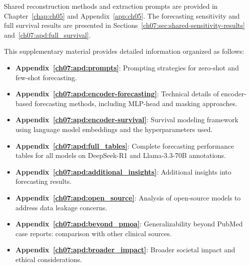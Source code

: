










 

Shared reconstruction methods and extraction prompts are provided in Chapter~\ref{chap:ch05} and Appendix~\ref{app:ch05}.
The forecasting sensitivity and full survival results are presented in Sections~\ref{ch07:sec:shared-sensitivity-results} and~\ref{ch07:apd:full_survival}.

This supplementary material provides detailed information organized as follows:
\begin{itemize}
    \item \textbf{Appendix~\ref{ch07:apd:prompts}}: Prompting strategies for zero-shot and few-shot forecasting.
    \item \textbf{Appendix~\ref{ch07:apd:encoder-forecasting}}: Technical details of encoder-based forecasting methods, including MLP-head and masking approaches.
    \item \textbf{Appendix~\ref{ch07:apd:encoder-survival}}: Survival modeling framework using language model embeddings and the hyperparameters used.
    \item \textbf{Appendix~\ref{ch07:apd:full_tables}}: Complete forecasting performance tables for all models on DeepSeek-R1 and Llama-3.3-70B annotations.
    \item \textbf{Appendix~\ref{ch07:apd:additional_insights}}: Additional insights into forecasting results.
    \item \textbf{Appendix~\ref{ch07:apd:open_source}}: Analysis of open-source models to address data leakage concerns.
    \item \textbf{Appendix~\ref{ch07:apd:beyond_pmoa}}: Generalizability beyond PubMed case reports: comparison with other clinical sources.
    \item \textbf{Appendix~\ref{ch07:apd:broader_impact}}: Broader societal impact and ethical considerations.
\end{itemize}

